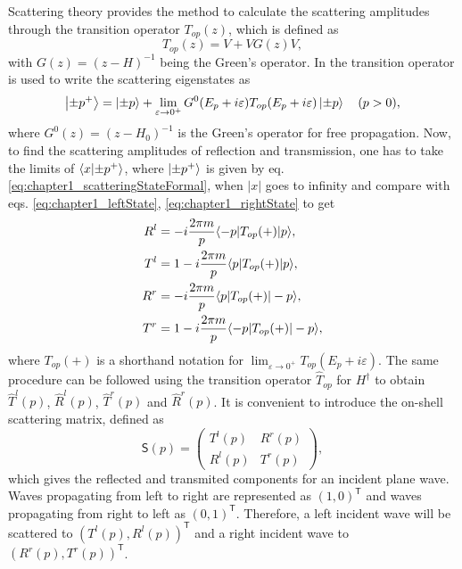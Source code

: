 Scattering theory provides the method to calculate the scattering amplitudes through the transition operator $T_{op}(z)$, which is defined as
%
\begin{equation}
T_{op}(z) = V + VG(z)V,
\label{eq:chapter1_transitionOperator_definition}
\end{equation}
%
with $G(z) = (z-H)^{-1}$ being the Green's operator. In \cite{Muga2004} the transition operator is used to write the scattering eigenstates as
%
\begin{equation}
  \ket{\pm p^+} =  \ket{\pm p} + \lim_{ \varepsilon\to 0^+ } G^0(E_p + i\varepsilon)T_{op}(E_p + i\varepsilon)\ket{\pm p}\quad (p>0),
  \label{eq:chapter1_scatteringStateFormal}
\end{equation}
%
where $G^0(z) = (z-H_0)^{-1}$ is the Green's operator for free propagation. Now, to find the scattering amplitudes of reflection and transmission, one has to take the limits of $\braket{x}{\pm p^+}$, where $\ket{\pm p^+}$ is given by eq. \eqref{eq:chapter1_scatteringStateFormal}, when $|x|$ goes to infinity and compare with eqs. \eqref{eq:chapter1_leftState}, \eqref{eq:chapter1_rightState} to get
%
\begin{align}
R^l&=-i\frac{2\pi m}{p}\la -p|T_{op}(+)|p\ra\nonumber,
\\
T^l&=1-i\frac{2\pi m}{p} \la p|T_{op}(+)|p\ra\nonumber,
\\
R^r&=-i\frac{2\pi m}{p}\la p|T_{op}(+)|-p\ra\nonumber,
\\
T^r&=1-i\frac{2\pi m}{p}\la -p|T_{op}(+)|-p\ra,
\label{eq:chapter1_amplitudesFromTOperator}
\end{align}
%
where $T_{op}(+)$ is a shorthand notation for $\lim_{ \varepsilon\to 0^+ } T_{op}(E_p + i\varepsilon)$. The same procedure can be followed using the transition operator $\widehat{T}_{op}$ for $H^\dagger$ to obtain $\widehat{T}^l(p)$, $\widehat{R}^l(p)$, $\widehat{T}^r(p)$ and $\widehat{R}^r(p)$. It is convenient to introduce the on-shell scattering matrix, defined as
%
\begin{equation}
  \mathsf{S}(p) =
  \left(
  \begin{array}{cc}
    T^l(p)&R^r(p)
    \\
    R^l(p)&T^r(p)
  \end{array}
  \right),
  \label{eq:chapter1_onShellMatrix}
\end{equation}
%
which gives the reflected and transmited components for an incident plane wave. Waves propagating from left to right are represented as $\left(1,0\right)^\mathsf{T}$ and waves propagating from right to left as $\left(0,1\right)^\mathsf{T}$. Therefore, a left incident wave will be scattered to $\left(T^l(p),R^l(p)\right)^\mathsf{T}$ and a right incident wave to $\left(R^r(p),T^r(p)\right)^\mathsf{T}$.

